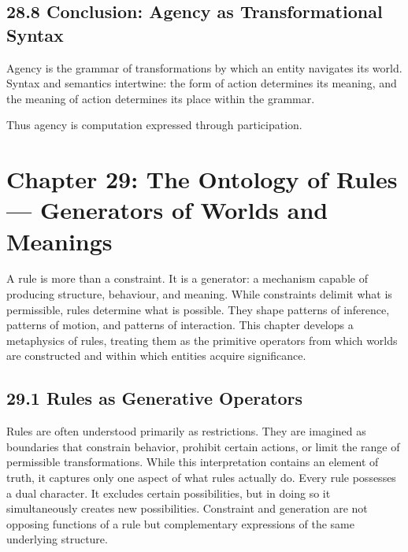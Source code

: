 \documentclass[12pt,letterpaper]{article}
\theoremstyle{remark}
\begin{document}
\subsection{28.8 Conclusion: Agency as Transformational Syntax}

Agency is the grammar of transformations by which an entity navigates its world. Syntax and semantics intertwine: the form of action determines its meaning, and the meaning of action determines its place within the grammar.

Thus agency is computation expressed through participation.

\newpage
\section{Chapter 29: The Ontology of Rules — Generators of Worlds and Meanings}

A rule is more than a constraint. It is a generator: a mechanism capable of producing structure, behaviour, and meaning. While constraints delimit what is permissible, rules determine what is possible. They shape patterns of inference, patterns of motion, and patterns of interaction. This chapter develops a metaphysics of rules, treating them as the primitive operators from which worlds are constructed and within which entities acquire significance.

\subsection{29.1 Rules as Generative Operators}

Rules are often understood primarily as restrictions. They are imagined as boundaries that constrain behavior, prohibit certain actions, or limit the range of permissible transformations. While this interpretation contains an element of truth, it captures only one aspect of what rules actually do. Every rule possesses a dual character. It excludes certain possibilities, but in doing so it simultaneously creates new possibilities. Constraint and generation are not opposing functions of a rule but complementary expressions of the same underlying structure.
\end{document}
